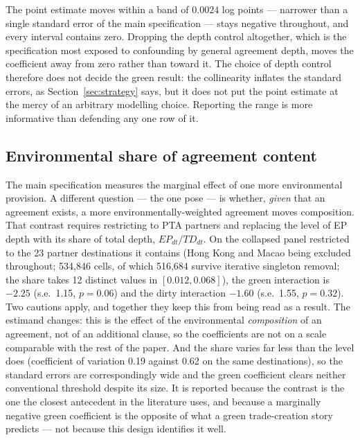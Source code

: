 \documentclass[12pt]{article}
\begin{document}
\begin{table}[htbp]
\centering
\caption{EP$\times$green under alternative depth controls (collapsed panel, WB index)}
\label{tab:depthbounds}

\end{table}

The point estimate moves within a band of $0.0024$ log points --- narrower than a single
standard error of the main specification --- stays negative throughout, and every interval
contains zero. Dropping the depth control altogether, which is the specification most
exposed to confounding by general agreement depth, moves the coefficient away from zero
rather than toward it. The choice of depth
control therefore does not decide the green result: the collinearity inflates the standard
errors, as Section~\ref{sec:strategy} says, but it does not put the point estimate at the
mercy of an arbitrary modelling choice. Reporting the range is more informative than
defending any one row of it.

\subsection{Environmental share of agreement content}

The main specification measures the marginal effect of one more environmental provision.
A different question --- the one \citet{abman2024} pose --- is whether, \emph{given} that
an agreement exists, a more environmentally-weighted agreement moves composition. That
contrast requires restricting to PTA partners and replacing the level of EP depth with
its share of total depth, $EP_{dt}/TD_{dt}$. On the collapsed panel restricted to the 23
partner destinations it contains (Hong Kong and Macao being excluded throughout;
534{,}846 cells, of which 516{,}684 survive iterative singleton
removal; the share takes 12 distinct values in
$[0.012, 0.068]$), the green interaction is $-2.25$ (s.e.\ 1.15, $p=0.06$) and the dirty
interaction $-1.60$ (s.e.\ 1.55, $p=0.32$). Two cautions apply, and together they keep
this from being read as a result. The estimand changes: this is the effect of the
environmental \emph{composition} of an agreement, not of an additional clause, so the
coefficients are not on a scale comparable with the rest of the paper. And the share
varies far less than the level does (coefficient of variation 0.19 against 0.62 on the
same destinations), so the standard errors are correspondingly wide and the green
coefficient clears neither conventional threshold despite its size. It is reported
because the contrast is the one the closest antecedent in the literature uses, and
because a marginally negative green coefficient is the opposite of what a green
trade-creation story predicts --- not because this design identifies it well.
\end{document}
